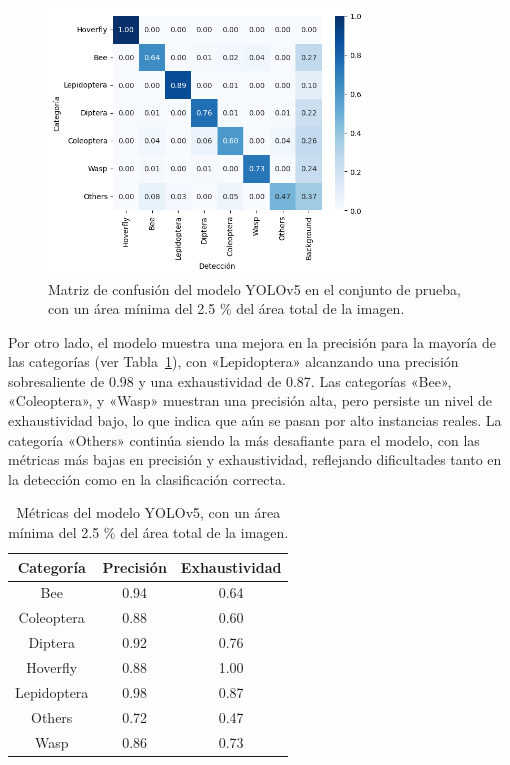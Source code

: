 \begin{figure}[H]
    \centering
    \includegraphics[width=0.75\textwidth]{Figuras/test_yolov5m_v01_area.png}
    \caption{Matriz de confusión del modelo YOLOv5 en el conjunto de prueba, con un área mínima del 2.5 \% del área total de la imagen.}
    \label{fig:matriz_confusion_yolov5_prueba_area}
\end{figure}


Por otro lado, el modelo muestra una mejora en la precisión para la mayoría de las categorías (ver Tabla~\ref{tab:metricas_area25}), con «Lepidoptera» alcanzando una precisión sobresaliente de 0.98 y una exhaustividad de 0.87.  Las categorías «Bee», «Coleoptera», y «Wasp» muestran una precisión alta, pero persiste un nivel de exhaustividad bajo, lo que indica que aún se pasan por alto instancias reales. La categoría «Others» continúa siendo la más desafiante para el modelo, con las métricas más bajas en precisión y exhaustividad, reflejando dificultades tanto en la detección como en la clasificación correcta.

\begin{table}[H]
    \centering\small
    \begin{tabular}{ccc}
    \toprule
          \textbf{Categoría} & \textbf{Precisión}  &  \textbf{Exhaustividad}\\ 
    \midrule
        Bee &  0.94 &  0.64 \\
        Coleoptera &  0.88 &  0.60 \\
        Diptera &  0.92 &  0.76 \\
        Hoverfly &  0.88 &  1.00 \\
        Lepidoptera &  0.98 &  0.87 \\
        Others &  0.72 &  0.47 \\
        Wasp &  0.86 &  0.73 \\
    \bottomrule
    \end{tabular}
    \caption{Métricas del modelo YOLOv5, con un área mínima del 2.5 \% del área total de la imagen.}
    \label{tab:metricas_area25}
\end{table}

